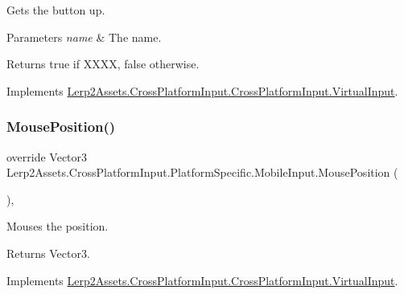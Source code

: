 Gets the button up. 


\begin{DoxyParams}{Parameters}
{\em name} & The name.\\
\hline
\end{DoxyParams}
\begin{DoxyReturn}{Returns}
{\ttfamily true} if X\+X\+XX, {\ttfamily false} otherwise.
\end{DoxyReturn}


Implements \hyperlink{class_lerp2_assets_1_1_cross_platform_input_1_1_cross_platform_input_1_1_virtual_input_aab782d66a80ed30cd1234f1f218fb968}{Lerp2\+Assets.\+Cross\+Platform\+Input.\+Cross\+Platform\+Input.\+Virtual\+Input}.

\mbox{\label{class_lerp2_assets_1_1_cross_platform_input_1_1_platform_specific_1_1_mobile_input_a94adeaf9c456a99d669348e16a381d88}} 
\subsubsection{\texorpdfstring{Mouse\+Position()}{MousePosition()}}
{\footnotesize\ttfamily override Vector3 Lerp2\+Assets.\+Cross\+Platform\+Input.\+Platform\+Specific.\+Mobile\+Input.\+Mouse\+Position (\begin{DoxyParamCaption}{ }\end{DoxyParamCaption})\hspace{0.3cm}{\ttfamily [inline]}, {\ttfamily [virtual]}}



Mouses the position. 

\begin{DoxyReturn}{Returns}
Vector3.
\end{DoxyReturn}


Implements \hyperlink{class_lerp2_assets_1_1_cross_platform_input_1_1_cross_platform_input_1_1_virtual_input_a76252149fde904955d20431d19daced8}{Lerp2\+Assets.\+Cross\+Platform\+Input.\+Cross\+Platform\+Input.\+Virtual\+Input}.

